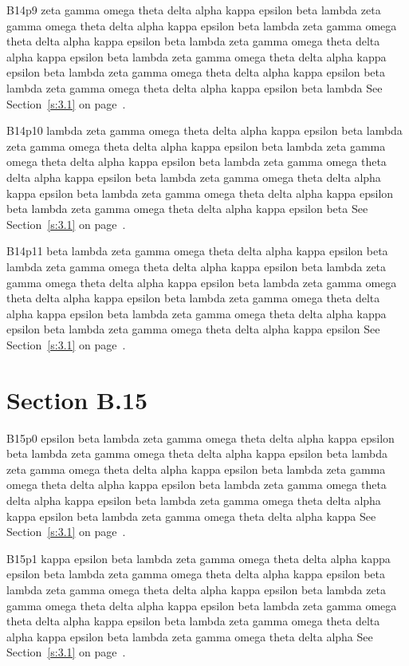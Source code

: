 B14p9 zeta gamma omega theta delta alpha kappa epsilon beta lambda zeta gamma omega theta delta alpha kappa epsilon beta lambda zeta gamma omega theta delta alpha kappa epsilon beta lambda zeta gamma omega theta delta alpha kappa epsilon beta lambda zeta gamma omega theta delta alpha kappa epsilon beta lambda zeta gamma omega theta delta alpha kappa epsilon beta lambda zeta gamma omega theta delta alpha kappa epsilon beta lambda See Section~\ref{s:3.1} on page~\pageref{s:3.1}.

B14p10 lambda zeta gamma omega theta delta alpha kappa epsilon beta lambda zeta gamma omega theta delta alpha kappa epsilon beta lambda zeta gamma omega theta delta alpha kappa epsilon beta lambda zeta gamma omega theta delta alpha kappa epsilon beta lambda zeta gamma omega theta delta alpha kappa epsilon beta lambda zeta gamma omega theta delta alpha kappa epsilon beta lambda zeta gamma omega theta delta alpha kappa epsilon beta See Section~\ref{s:3.1} on page~\pageref{s:3.1}.

B14p11 beta lambda zeta gamma omega theta delta alpha kappa epsilon beta lambda zeta gamma omega theta delta alpha kappa epsilon beta lambda zeta gamma omega theta delta alpha kappa epsilon beta lambda zeta gamma omega theta delta alpha kappa epsilon beta lambda zeta gamma omega theta delta alpha kappa epsilon beta lambda zeta gamma omega theta delta alpha kappa epsilon beta lambda zeta gamma omega theta delta alpha kappa epsilon See Section~\ref{s:3.1} on page~\pageref{s:3.1}.

\section{Section B.15}\label{s:B.15}
B15p0 epsilon beta lambda zeta gamma omega theta delta alpha kappa epsilon beta lambda zeta gamma omega theta delta alpha kappa epsilon beta lambda zeta gamma omega theta delta alpha kappa epsilon beta lambda zeta gamma omega theta delta alpha kappa epsilon beta lambda zeta gamma omega theta delta alpha kappa epsilon beta lambda zeta gamma omega theta delta alpha kappa epsilon beta lambda zeta gamma omega theta delta alpha kappa See Section~\ref{s:3.1} on page~\pageref{s:3.1}.

B15p1 kappa epsilon beta lambda zeta gamma omega theta delta alpha kappa epsilon beta lambda zeta gamma omega theta delta alpha kappa epsilon beta lambda zeta gamma omega theta delta alpha kappa epsilon beta lambda zeta gamma omega theta delta alpha kappa epsilon beta lambda zeta gamma omega theta delta alpha kappa epsilon beta lambda zeta gamma omega theta delta alpha kappa epsilon beta lambda zeta gamma omega theta delta alpha See Section~\ref{s:3.1} on page~\pageref{s:3.1}.


